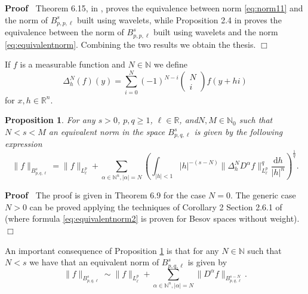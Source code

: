 \documentclass[a4paper,10pt]{article}
\newcommand{\mathd}{\mathrm{d}}
\newenvironment{proof}{\noindent\textbf{Proof\ }}{\hspace*{\fill}$\Box$\medskip}
\newtheorem{proposition}[theorem]{Proposition}
{\theorembodyfont{\rmfamily}\newtheorem{remark}[theorem]{Remark}}
\begin{document}
\begin{proof}
  Theorem 6.15, in {\cite{Triebel2006}}, proves the equivalence between norm
  {\eqref{eq:norm11}} and the norm of $B^s_{p, p, \ell}$ built using wavelets,
  while Proposition 2.4 in {\cite{HaiLabb2017}} proves the equivalence between
  the norm of $B^s_{p, p, \ell}$ built using wavelets and the norm
  {\eqref{eq:equivalentnorm}}. Combining the two results we obtain the thesis.
\end{proof}

If $f$ is a measurable function and $N \in \mathbb{N}$ we define
\[ \Delta^N_h (f) (y) = \sum_{i = 0}^N (- 1)^{N - i} \left( \begin{array}{c}
     N\\
     i
   \end{array} \right) f (y + h i) \]
for $x, h \in \mathbb{R}^n$.

\begin{proposition}
  \label{proposition_difference}For any $s > 0$, $p, q \geqslant 1$, $\ell \in
  \mathbb{R}$, and$N, M \in \mathbb{N}_0$ such that $N < s < M$ an equivalent
  norm in the space $B^s_{p, q, \ell}$ is given by the following expression
  \begin{equation}
    \| f \|_{B^s_{p, q, \ell}} = \| f \|_{L^p_{\ell}} + \sum_{\alpha \in
    \mathbb{N}^n, | \alpha | = N} \left( \int_{| h | < 1} | h |^{- (s - N)} \|
    \Delta_h^N D^{\alpha} f \|_{L^p_{\ell}}^q \frac{\mathd h}{| h |^n}
    \right)^{\frac{1}{q}} . \label{eq:equivalentnorm2}
  \end{equation}
\end{proposition}

\begin{proof}
  The proof is given in {\cite{Triebel2006}} Theorem 6.9 for the case $N = 0$.
  The generic case $N > 0$ can be proved applying the techniques of Corollary
  2 Section 2.6.1 of {\cite{Triebel1992}} (where formula
  {\eqref{eq:equivalentnorm2}} is proven for Besov spaces without weight).
\end{proof}

\begin{remark}
  \label{remark_equivalentnorm}An important consequence of Proposition
  \ref{proposition_difference} is that for any $N \in \mathbb{N}$ such that $N
  < s$ we have that an equivalent norm of $B^s_{p, q, \ell}$ is given by
  \begin{equation}
    \| f \|_{B^s_{p, q, \ell}} \sim \| f \|_{L^p_{\ell}} + \sum_{\alpha \in
    \mathbb{N}^n, | \alpha | = N} \| D^{\alpha} f \|_{B^{s - N}_{p, q, \ell}}
    . \label{eq:equivalentenorm3}
  \end{equation}
\end{remark}
\end{document}
